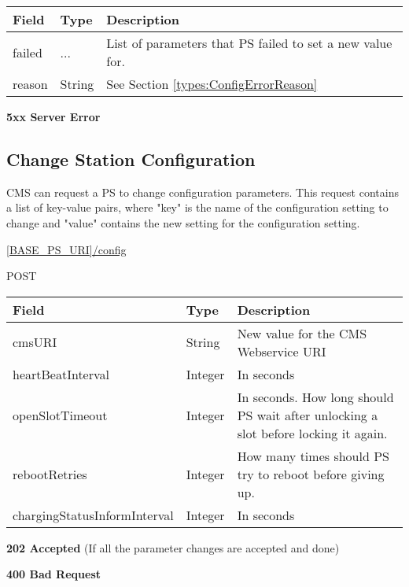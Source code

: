\begin{tabularx}{\linewidth}{ | l | l | X | }
  \hline
  \rowcolor{table-head}
  Field & Type & Description \\
  \hline
  failed		& ... & List of parameters that \acs{PS} failed to set a new value for.\\
  reason 	& String & See Section \ref{types:ConfigErrorReason} \\
  \hline
\end{tabularx}

\textbf{5xx Server Error}

\subsection{Change Station Configuration}
\label{cms:change-conf}

\acs{CMS} can request a \acs{PS} to change configuration parameters. This request contains a list of key-value pairs, where "key" is the name of the configuration setting to change and "value" contains the new setting for the configuration setting.

 \url{[BASE_PS_URI]/config}

 POST

\begin{table}[!h]
\vspace{-7mm}
\begin{tabularx}{\linewidth}{ | l | l | X | }
  \hline
  \rowcolor{table-head}
  Field & Type & Description \\
  \hline
  cmsURI 			& String 		& New value for the \acs{CMS} Webservice URI \\
  heartBeatInterval 			& Integer 		& In seconds \\
  openSlotTimeout 			& Integer 		& In seconds. How long should \acs{PS} wait after unlocking a slot before locking it again. \\
  rebootRetries 				& Integer 		& How many times should \acs{PS} try to reboot before giving up.\\
  chargingStatusInformInterval 	& Integer 		& In seconds \\
  \hline
\end{tabularx}
\end{table}

\textbf{202 Accepted} (If all the parameter changes are accepted and done)

 \textbf{400 Bad Request}

